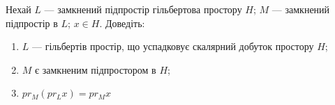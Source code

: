 \begin{exercise}
    Нехай $L$ --- замкнений підпростір гільбертова простору $H$; $M$ --- замкнений підпростір
    в $L$; $x \in H$. Доведіть:
    \begin{enumerate}[\label = \ukr*)]
        \item $L$ --- гільбертів простір, що успадковує скалярний добуток простору $H$;
        \item $M$ є замкненим підпростором в $H$;
        \item $pr_M (pr_L x) = pr_M x$
    \end{enumerate}
\end{exercise}
